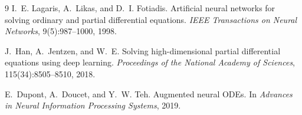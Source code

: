 \documentclass[11pt]{article}
\begin{document}
\begin{thebibliography}{9}
I.~E. Lagaris, A.~Likas, and D.~I. Fotiadis.
Artificial neural networks for solving ordinary and partial differential equations.
\emph{IEEE Transactions on Neural Networks}, 9(5):987--1000, 1998.

J.~Han, A.~Jentzen, and W.~E.
Solving high-dimensional partial differential equations using deep learning.
\emph{Proceedings of the National Academy of Sciences}, 115(34):8505--8510, 2018.

E.~Dupont, A.~Doucet, and Y.~W. Teh.
Augmented neural ODEs.
In \emph{Advances in Neural Information Processing Systems}, 2019.

\end{thebibliography}
\end{document}
